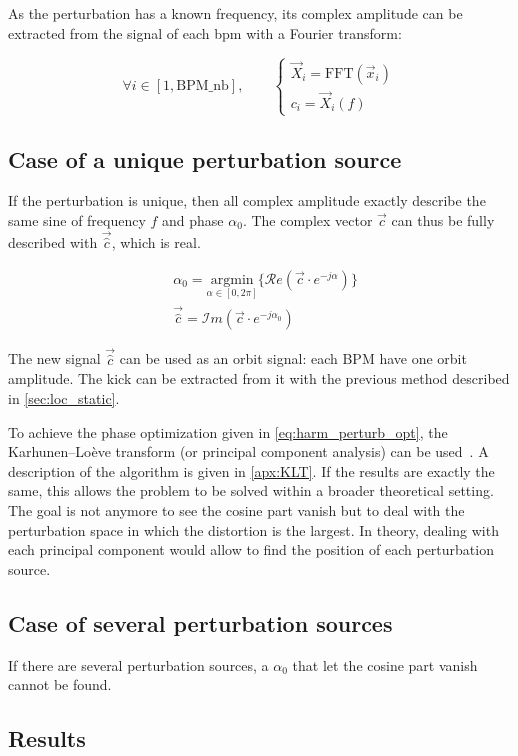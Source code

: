 As the perturbation has a known frequency, its complex amplitude can be extracted from the signal of each \gls{bpm} with a Fourier transform:

\begin{equation}
\forall i \in [1, \mathrm{BPM\_nb}], \qquad 
\begin{cases}
\vec{X}_i = \mathrm{FFT}(\vec{x}_i) \\
c_i = \vec{X}_i(f)
\end{cases}
\end{equation}

\subsection{Case of a unique perturbation source}
If the perturbation is unique, then all complex amplitude exactly describe the same sine of frequency $f$ and phase $\alpha_0$. The complex vector $\vec{c}$ can thus be fully described with $\vec{\hat{c}}$, which is real.

\begin{align}
&\alpha_0 = \underset{\alpha \in [0, 2\pi]}{\textrm{argmin}}\{\mathcal{R}e (\vec{c} \cdot e^{-j\alpha}) \} \label{eq:harm_perturb_opt}\\
&\vec{\hat{c}} = \mathcal{I}m (\vec{c} \cdot e^{-j\alpha_0})
\end{align}

The new signal $\vec{\hat{c}}$ can be used as an orbit signal: each BPM have one orbit amplitude. The kick can be extracted from it with the previous method described in \cref{sec:loc_static}.

\remark To achieve the phase optimization given in \cref{eq:harm_perturb_opt}, the Karhunen–Loève transform (or principal component analysis) can be used~\cite{book:wang_2012}. A description of the algorithm is given in \cref{apx:KLT}. If the results are exactly the same, this allows the problem to be solved within a broader theoretical setting. The goal is not anymore to see the cosine part vanish but to deal with the perturbation space in which the distortion is the largest. In theory, dealing with each principal component would allow to find the position of each perturbation source.

\subsection{Case of several perturbation sources}
If there are several perturbation sources, a $\alpha_0$ that let the cosine part vanish cannot be found. 


\subsection{Results}

